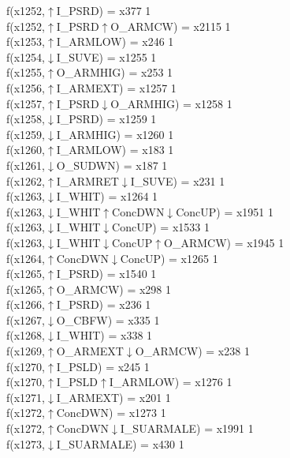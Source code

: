 f(x1252,$\uparrow$I\_PSRD) = x377 {1} \\
f(x1252,$\uparrow$I\_PSRD$\uparrow$O\_ARMCW) = x2115 {1} \\
f(x1253,$\uparrow$I\_ARMLOW) = x246 {1} \\
f(x1254,$\downarrow$I\_SUVE) = x1255 {1} \\
f(x1255,$\uparrow$O\_ARMHIG) = x253 {1} \\
f(x1256,$\uparrow$I\_ARMEXT) = x1257 {1} \\
f(x1257,$\uparrow$I\_PSRD$\downarrow$O\_ARMHIG) = x1258 {1} \\
f(x1258,$\downarrow$I\_PSRD) = x1259 {1} \\
f(x1259,$\downarrow$I\_ARMHIG) = x1260 {1} \\
f(x1260,$\uparrow$I\_ARMLOW) = x183 {1} \\
f(x1261,$\downarrow$O\_SUDWN) = x187 {1} \\
f(x1262,$\uparrow$I\_ARMRET$\downarrow$I\_SUVE) = x231 {1} \\
f(x1263,$\downarrow$I\_WHIT) = x1264 {1} \\
f(x1263,$\downarrow$I\_WHIT$\uparrow$ConcDWN$\downarrow$ConcUP) = x1951 {1} \\
f(x1263,$\downarrow$I\_WHIT$\downarrow$ConcUP) = x1533 {1} \\
f(x1263,$\downarrow$I\_WHIT$\downarrow$ConcUP$\uparrow$O\_ARMCW) = x1945 {1} \\
f(x1264,$\uparrow$ConcDWN$\downarrow$ConcUP) = x1265 {1} \\
f(x1265,$\uparrow$I\_PSRD) = x1540 {1} \\
f(x1265,$\uparrow$O\_ARMCW) = x298 {1} \\
f(x1266,$\uparrow$I\_PSRD) = x236 {1} \\
f(x1267,$\downarrow$O\_CBFW) = x335 {1} \\
f(x1268,$\downarrow$I\_WHIT) = x338 {1} \\
f(x1269,$\uparrow$O\_ARMEXT$\downarrow$O\_ARMCW) = x238 {1} \\
f(x1270,$\uparrow$I\_PSLD) = x245 {1} \\
f(x1270,$\uparrow$I\_PSLD$\uparrow$I\_ARMLOW) = x1276 {1} \\
f(x1271,$\downarrow$I\_ARMEXT) = x201 {1} \\
f(x1272,$\uparrow$ConcDWN) = x1273 {1} \\
f(x1272,$\uparrow$ConcDWN$\downarrow$I\_SUARMALE) = x1991 {1} \\
f(x1273,$\downarrow$I\_SUARMALE) = x430 {1} \\
